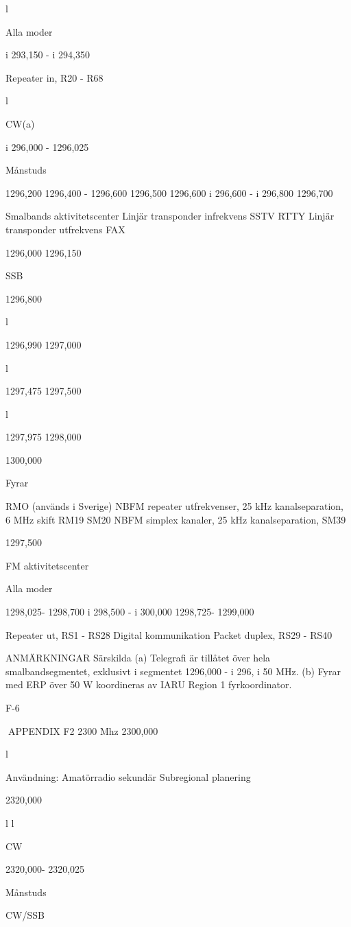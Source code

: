 \documentclass[a4paper,twoside,twocolumn,openright]{book}
\begin{document}
{{{{{{{{{{{l

Alla moder

i 293,150 - i 294,350

Repeater in, R20 - R68

l

CW(a)

i 296,000 - 1296,025

Månstuds

1296,200
1296,400 - 1296,600
1296,500
1296,600
i 296,600 - i 296,800
1296,700

Smalbands aktivitetscenter
Linjär transponder infrekvens
SSTV
RTTY
Linjär transponder utfrekvens
FAX

1296,000
1296,150

SSB

1296,800

l

1296,990
1297,000

l

1297,475
1297,500

l

1297,975
1298,000

1300,000

Fyrar

RMO
(används i Sverige)
NBFM repeater utfrekvenser,
25 kHz kanalseparation, 6 MHz skift
RM19
SM20
NBFM simplex kanaler,
25 kHz kanalseparation,
SM39

1297,500

FM aktivitetscenter

Alla moder

1298,025- 1298,700
i 298,500 - i 300,000
1298,725- 1299,000

Repeater ut, RS1 - RS28
Digital kommunikation
Packet duplex, RS29 - RS40

ANMÄRKNINGAR
Särskilda
(a) Telegrafi är tillåtet över hela smalbandsegmentet, exklusivt i segmentet 1296,000 - i 296, i 50 MHz.
(b) Fyrar med ERP över 50 W koordineras av IARU Region 1 fyrkoordinator.

F-6

APPENDIX F2
2300 Mhz
2300,000

l

Användning: Amatörradio sekundär
Subregional planering

2320,000

l
l

CW

2320,000- 2320,025

Månstuds

CW/SSB

}}}}}}}}}}}
\end{document}
